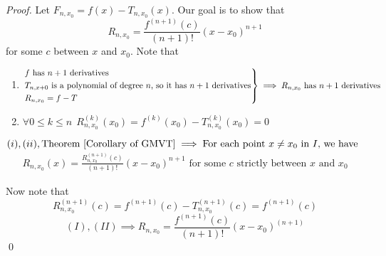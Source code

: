 \begin{proof}
    Let $F_{n, x_0}=f(x)-T_{n,x_0}(x).$ Our goal is to show that
    $$
    R_{n,x_0} = \frac{f^{(n+1)}(c)}{(n+1)!}(x-x_0)^{n+1}
    $$
    for some $c$ between $x$ and $x_0$. Note that
    \begin{enumerate}[$(i)$]
        \item $\begin{rcases*}
            \text{$f$ has $n+1$ derivatives}\\
            \text{$T_{n,x+0}$ is a polynomial of degree $n$, so it has $n+1$ derivatives} \\
            R_{n, x_0} = f - T
        \end{rcases*} \implies \text{$R_{n, x_0}$ has $n+1$ derivatives}$
        \item $\forall 0 \leq k \leq n ~~R_{n,x_0}^{(k)}(x_0) = f^{(k)}(x_0) - T_{n,x_0}^{(k)}(x_0) = 0$
    \end{enumerate}

    $(i), (ii), \text{Theorem $\ref{Corollary of GMVT}$} \implies \text{For each point $x \not = x_0$ in $I$, we have }$
    \begin{align*}
        R_{n,x_0}(x) = \frac{R_{n,x_0}^{(n+1)}(c)}{(n+1)!}(x-x_0)^{n+1} \text{ for some $c$ strictly between $x$ and $x_0$}
        \tag{$I$}
    \end{align*}

    Now note that
    \begin{equation*}
        R_{n,x_0}^{(n+1)}(c) = f^{(n+1)}(c) - T_{n, x_0}^{(n+1)}(c) = f^{(n+1)}(c)
        \tag{$II$}
    \end{equation*}
    $$
    (I), (II) \implies R_{n,x_0} = \frac{f^{(n+1)}(c)}{(n+1)!}(x-x_0)^{(n+1)}
    $$
    \qed
\end{proof}